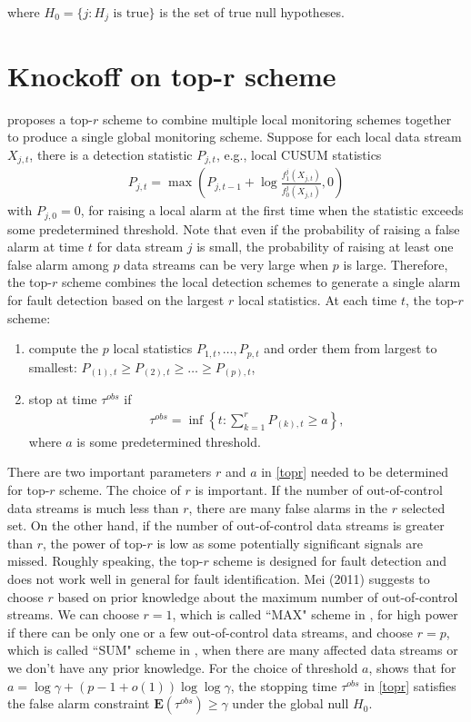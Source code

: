 \documentclass[a4paper,12pt]{article}
\begin{document}
where $H_0 = \{j: H_j \text{ is true}\}$ is the set of true null hypotheses.




\section{Knockoff on top-r scheme}

\cite{mei2011quickest} proposes a top-$r$ scheme to combine multiple local monitoring schemes together to produce a single global monitoring scheme. Suppose for each local data stream $X_{j,t}$, there is a detection statistic $P_{j,t}$, e.g., local CUSUM statistics
\begin{align}
P_{j,t} = \max \left( P_{j,t-1}+ \log \frac{f_1^j(X_{j,t})}{f_0^j(X_{j,t})}, 0 \right)\label{CUSUMtopr}
\end{align}
with $P_{j,0}=0$, for raising a local alarm at the first time when the statistic exceeds some predetermined threshold. Note that even if the probability of raising a false alarm at time $t$ for data stream $j$ is small, the probability of raising at least one false alarm among $p$ data streams can be very large when $p$ is large. Therefore, the top-$r$ scheme combines the local detection schemes to generate a single alarm for fault detection based on the largest $r$ local statistics. At each time $t$, the top-$r$ scheme:
\begin{enumerate}
\item compute the $p$ local statistics $P_{1,t},\ldots,P_{p,t}$ and order them from largest to smallest: $P_{(1),t} \ge P_{(2),t} \ge \dots \ge P_{(p),t}$,
\item stop at time $\tau^{obs}$ if
\begin{align}
\tau^{obs}=\inf \left\{ t: \sum_{k=1}^r P_{(k), t}\ge a \right\},\label{topr}
\end{align}
where $a$ is some predetermined threshold.
\end{enumerate} 
There are two important parameters $r$ and $a$ in \eqref{topr} needed to be determined for top-$r$ scheme. The choice of $r$ is important. If the number of out-of-control data streams is much less than $r$, there are many false alarms in the $r$ selected set. On the other hand, if the number of out-of-control data streams is greater than $r$, the power of top-$r$ is low as some potentially significant signals are missed. Roughly speaking, the top-$r$ scheme is designed for fault detection and does not work well in general for fault identification. Mei (2011) suggests to choose $r$ based on prior knowledge about the maximum number of out-of-control streams. We can choose $r=1$, which is called ``MAX" scheme in \cite{mei2011quickest}, for high power if there can be only one or a few out-of-control data streams, and choose $r=p$, which is called ``SUM" scheme in \cite{mei2011quickest}, when there are many affected data streams or we don't have any prior knowledge. For the choice of threshold $a$, \cite{mei2011quickest} shows that for $a = \log\gamma + (p-1+o(1))\log\log\gamma$, the stopping time $\tau^{obs}$ in \eqref{topr} satisfies the false alarm constraint $\mathbf{E}(\tau^{obs}) \ge \gamma$ under the global null $H_0$.
\end{document}
